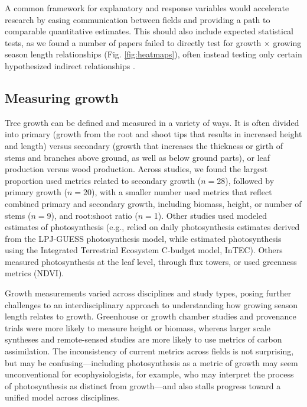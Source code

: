 \documentclass[11pt]{article}
\begin{document}
A common framework for explanatory and response variables would accelerate research by easing communication between fields and providing a path to comparable quantitative estimates. 
This should also include expected statistical tests, as we found a number of papers failed to directly test for growth $\times$ growing season length relationships (Fig. \ref{fig:heatmaps}), often instead testing only certain hypothesized indirect relationships \citep[e.g. spring temperature $\times$ growth in][]{dow2022warm}. %

\subsection*{Measuring growth}

Tree growth can be defined and measured in a variety of ways. It is often divided into primary (growth from the root and shoot tips that results in increased height and length) versus secondary (growth that increases the thickness or girth of stems and branches above ground, as well as below ground parts), or leaf production versus wood production. Across studies, we found the largest proportion used metrics related to secondary growth ($n=$28), followed by primary growth ($n=$20), with a smaller number used metrics that reflect combined primary and secondary growth, including biomass, height, or number of stems ($n=$9), and root:shoot ratio ($n =$1).  Other studies used modeled estimates of photosynthesis (e.g., \cite{smith2014implications} relied on daily photosynthesis estimates derived from the LPJ-GUESS photosynthesis model, while \cite{chen2000approaches} estimated photosynthesis using the Integrated Terrestrial Ecosystem C-budget model, InTEC). 
Others measured photosynthesis at the leaf level, through flux towers, or used greenness metrics (NDVI). 

Growth measurements varied across disciplines and study types, posing further challenges to an interdisciplinary approach to understanding how growing season length relates to growth. 
Greenhouse or growth chamber studies and provenance trials were more likely to measure height or biomass, whereas larger scale syntheses and remote-sensed studies are more likely to use metrics of carbon assimilation. 
The inconsistency of current metrics across fields is not surprising, but may be confusing---including photosynthesis as a metric of growth may seem unconventional for ecophysiologists, for example, who may interpret the process of photosynthesis as distinct from growth---and also stalls progress toward a unified model across disciplines.
\end{document}
